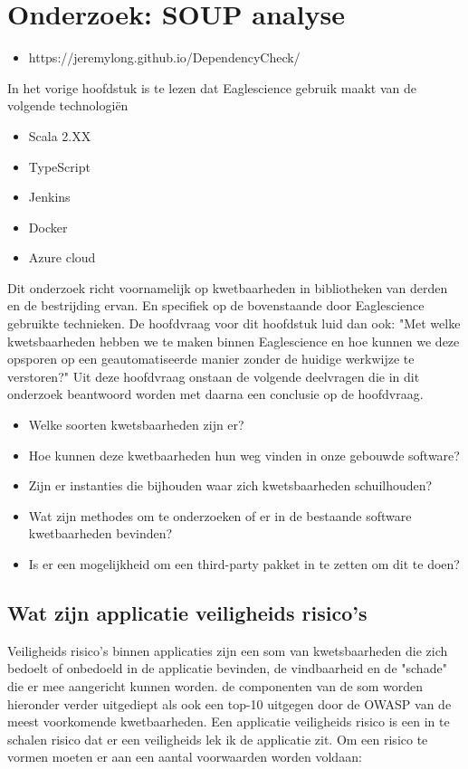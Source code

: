 
\chapter{Onderzoek: SOUP analyse} %

\begin{itemize}
\item https://jeremylong.github.io/DependencyCheck/
\end{itemize}

\label{OndSOUPAnalyse} %
In het vorige hoofdstuk is te lezen dat Eaglescience gebruik maakt van de volgende technologi\"en
\begin{itemize}
  \item Scala 2.XX
  \item TypeScript
  \item Jenkins
  \item Docker
  \item Azure cloud
\end{itemize}
Dit onderzoek richt voornamelijk op kwetbaarheden in bibliotheken  van derden en de bestrijding ervan. En specifiek op de bovenstaande door Eaglescience gebruikte technieken. De hoofdvraag voor dit hoofdstuk luid dan ook: "Met welke kwetsbaarheden hebben we te maken binnen Eaglescience en hoe kunnen we deze opsporen op een geautomatiseerde manier zonder de huidige werkwijze te verstoren?" Uit deze hoofdvraag onstaan de volgende deelvragen die in dit onderzoek beantwoord worden met daarna een conclusie op de hoofdvraag.

\begin{itemize}
\item Welke soorten kwetsbaarheden zijn er?
\item Hoe kunnen deze kwetbaarheden hun weg vinden in onze gebouwde software?
\item Zijn er instanties die bijhouden waar zich kwetsbaarheden schuilhouden?
\item Wat zijn methodes om te onderzoeken of er in de bestaande software kwetbaarheden bevinden?
\item Is er een mogelijkheid om een third-party pakket in te zetten om dit te doen?
\end{itemize}

\section{Wat zijn applicatie veiligheids risico's}
Veiligheids risico's binnen applicaties zijn een som van kwetsbaarheden die zich bedoelt of onbedoeld in de applicatie bevinden, de vindbaarheid en de "schade" die er mee aangericht kunnen worden. de componenten van de som worden hieronder verder uitgediept als ook een top-10 uitgegen door de OWASP van de meest voorkomende kwetbaarheden.
Een applicatie veiligheids risico is een in te schalen risico dat er een veiligheids lek ik de applicatie zit. Om een risico te vormen moeten er aan een aantal voorwaarden worden voldaan:


